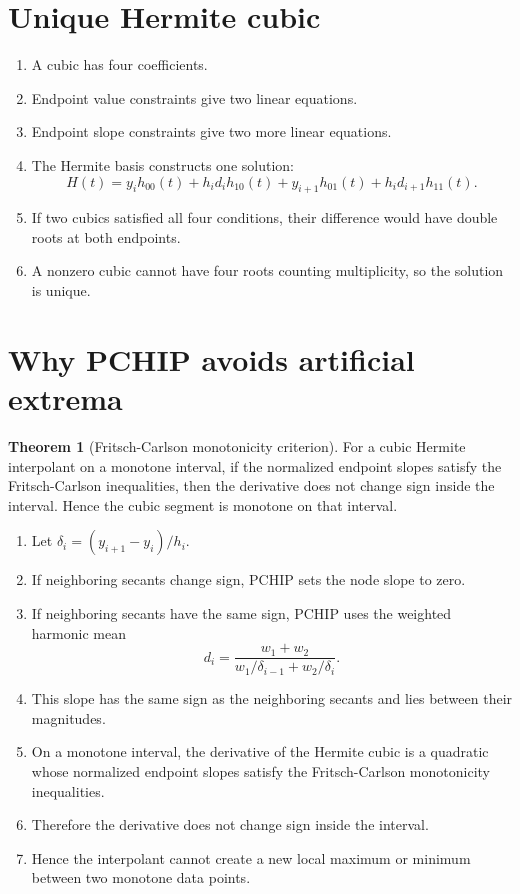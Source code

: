 \documentclass[11pt,oneside]{book}
\theoremstyle{definition}
\newtheorem{theorem}{Theorem}[chapter]
\newenvironment{proofsteps}
{\begin{enumerate}[label=\textbf{Line \arabic*.}, itemsep=0.35em]}
{\end{enumerate}}
\begin{document}
\section{Unique Hermite cubic}
\begin{proofsteps}
\item A cubic has four coefficients.
\item Endpoint value constraints give two linear equations.
\item Endpoint slope constraints give two more linear equations.
\item The Hermite basis constructs one solution:
\[
H(t)=y_i h_{00}(t)+h_i d_i h_{10}(t)+y_{i+1}h_{01}(t)+h_i d_{i+1}h_{11}(t).
\]
\item If two cubics satisfied all four conditions, their difference would have double roots at both endpoints.
\item A nonzero cubic cannot have four roots counting multiplicity, so the solution is unique.
\end{proofsteps}

\section{Why PCHIP avoids artificial extrema}
\begin{theorem}[Fritsch-Carlson monotonicity criterion]
For a cubic Hermite interpolant on a monotone interval, if the normalized endpoint slopes satisfy the Fritsch-Carlson inequalities, then the derivative does not change sign inside the interval. Hence the cubic segment is monotone on that interval.
\end{theorem}
\begin{proofsteps}
\item Let \(\delta_i=(y_{i+1}-y_i)/h_i\).
\item If neighboring secants change sign, PCHIP sets the node slope to zero.
\item If neighboring secants have the same sign, PCHIP uses the weighted harmonic mean
\[
d_i=\frac{w_1+w_2}{w_1/\delta_{i-1}+w_2/\delta_i}.
\]
\item This slope has the same sign as the neighboring secants and lies between their magnitudes.
\item On a monotone interval, the derivative of the Hermite cubic is a quadratic whose normalized endpoint slopes satisfy the Fritsch-Carlson monotonicity inequalities.
\item Therefore the derivative does not change sign inside the interval.
\item Hence the interpolant cannot create a new local maximum or minimum between two monotone data points.
\end{proofsteps}
\end{document}
